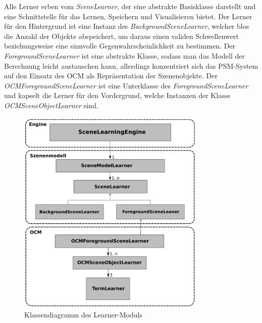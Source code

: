 Alle Lerner erben vom \textit{SceneLearner}, der eine abstrakte Basisklasse darstellt und eine Schnittstelle für das Lernen, Speichern und Visualisieren bietet. Der Lerner für den Hintergrund ist eine Instanz des \textit{BackgroundSceneLearner}, welcher blos die Anzahl der Objekte abspeichert, um daraus einen validen Schwellenwert beziehungsweise eine sinnvolle Gegenwahrscheinlichkeit zu bestimmen. Der \textit{ForegroundSceneLearner} ist eine abstrakte Klasse, sodass man das Modell der Berechnung leicht austauschen kann, allerdings konzentriert sich das PSM-System auf den Einsatz des OCM als Repräsentation der Szenenobjekte. Der \textit{OCMForegroundSceneLearner} ist eine Unterklasse des \textit{ForegroundSceneLearner} und kapselt die Lerner für den Vordergrund, welche Instanzen der Klasse \textit{OCMSceneObjectLearner} sind.
\cite{gehrung14}
\begin{figure}
	\centering
	\includegraphics[width=9cm]{bilder/LearnerClass.pdf}
	\caption{Klassendiagramm des Learner-Moduls \cite{gehrung14}}
	\label{img:learnerclass}
\end{figure}

